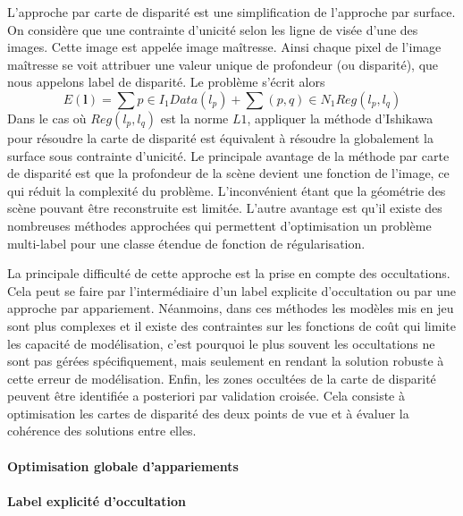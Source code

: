 \documentclass[../main/These_Mathias_Paget.tex]{subfiles}
\begin{document}
L'approche par carte de disparité est une simplification de l'approche par surface. On considère que une contrainte d'unicité selon les ligne de visée d'une des images. Cette image est appelée image maîtresse. Ainsi chaque pixel de l'image maîtresse se voit attribuer une valeur unique de profondeur (ou disparité), que nous appelons label de disparité. Le problème s'écrit alors
\begin{equation}
E(\boldsymbol{l}) = \sum{p \in I_1}{Data(l_p)} + \sum{(p,q) \in N_1}{Reg(l_p,l_q)}
\end{equation}
Dans le cas où $Reg(l_p,l_q)$ est la norme $L1$, appliquer la méthode d'Ishikawa pour résoudre la carte de disparité est équivalent à résoudre la globalement la surface sous contrainte d'unicité. Le principale avantage de la méthode par carte de disparité est que la profondeur de la scène devient une fonction de l'image, ce qui réduit la complexité du problème. L’inconvénient étant que la géométrie des scène pouvant être reconstruite est limitée. L'autre avantage est qu'il existe des nombreuses méthodes approchées qui permettent d'optimisation un problème multi-label pour une classe étendue de fonction de régularisation.

La principale difficulté de cette approche est la prise en compte des occultations. Cela peut se faire par l'intermédiaire d'un label explicite d'occultation ou par une approche par appariement. Néanmoins, dans ces méthodes les modèles mis en jeu sont plus complexes et il existe des contraintes sur les fonctions de coût qui limite les capacité de modélisation, c'est pourquoi le plus souvent les occultations ne sont pas gérées spécifiquement, mais seulement en rendant la solution robuste à cette erreur de modélisation. Enfin, les zones occultées de la carte de disparité peuvent être identifiée a posteriori par validation croisée. Cela consiste à optimisation les cartes de disparité des deux points de vue et à évaluer la cohérence des solutions entre elles.

\paragraph*{Optimisation globale d'appariements}

\paragraph*{Label explicité d'occultation}
\end{document}
